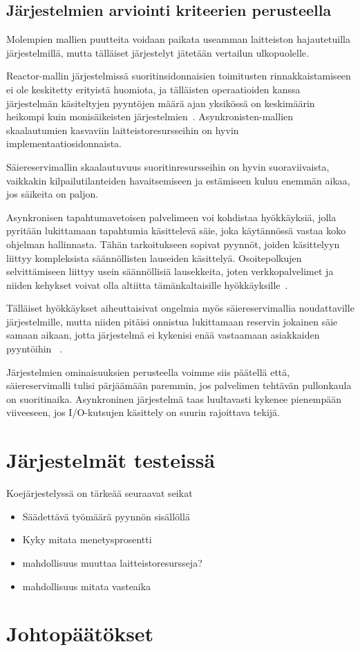 \documentclass[12pt]{article}
\begin{document}
\subsection{Järjestelmien arviointi kriteerien perusteella}
Molempien mallien puutteita voidaan paikata useamman laitteiston hajautetuilla 
järjestelmillä, mutta tälläiset järjestelyt jätetään vertailun ulkopuolelle.

Reactor-mallin järjestelmissä suoritinsidonnaisien
toimitusten rinnakkaistamiseen ei ole keskitetty erityistä huomiota, ja tälläisten operaatioiden
kanssa järjestelmän käsiteltyjen pyyntöjen määrä ajan yksikössä on keskimäärin heikompi
kuin monisäikeisten järjestelmien~\cite{davis_case_2017}.
Asynkronisten-mallien skaalautumien kasvaviin laitteistoresursseihin on hyvin
implementaatiosidonnaista.

Säiereservimallin skaalautuvuus suoritinresursseihin on hyvin suoraviivaista,
vaikkakin kilpailutilanteiden havaitsemiseen ja estämiseen kuluu enemmän aikaa,
jos säikeita on paljon.

Asynkronisen tapahtumavetoisen palvelimeen voi kohdistaa hyökkäyksiä, jolla pyritään 
lukittamaan tapahtumia käsittelevä säie, joka käytännössä vastaa koko ohjelman hallinnasta.
Tähän tarkoitukseen sopivat pyynnöt,
joiden käsittelyyn liittyy kompleksista säännöllisten lauseiden käsittelyä.
Osoitepolkujen selvittämiseen liittyy usein säännöllisiä lausekkeita,
joten verkkopalvelimet ja niiden
kehykset voivat olla altiitta tämänkaltaisille hyökkäyksille~\cite{davis_case_2017}.

Tälläiset hyökkäykset aiheuttaisivat ongelmia myös säiereservimallia
noudattaville järjestelmille, mutta niiden pitäisi onnistua
lukittamaan reservin jokainen säie samaan aikaan, jotta
järjestelmä ei kykenisi enää vastaamaan asiakkaiden pyyntöihin ~\cite{davis_case_2017}.

Järjestelmien ominaisuuksien perusteella voimme siis päätellä että,
säiereservimalli
tulisi pärjäämään paremmin, jos palvelimen tehtävän pullonkaula on suoritinaika.
Asynkroninen järjestelmä
taas luultavasti kykenee pienempään viiveeseen, jos I/O-kutsujen käsittely on suurin rajoittava tekijä.
\section{Järjestelmät testeissä}
Koejärjestelyssä on tärkeää seuraavat seikat

\begin{itemize}
    \item Säädettävä työmäärä pyynnön sisällöllä
    \item Kyky mitata menetysprosentti
    \item mahdollisuus muuttaa laitteistoresursseja?
    \item mahdollisuus mitata vasteaika
\end{itemize}
\section{Johtopäätökset}


\end{document}
